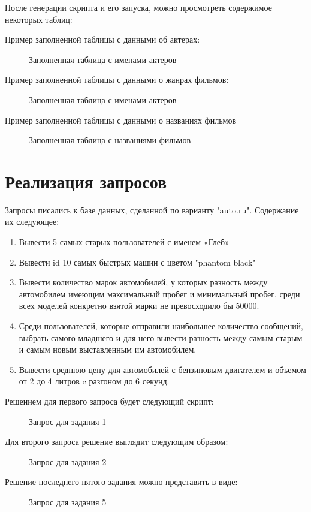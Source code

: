 После генерации скрипта и его запуска, можно просмотреть содержимое некоторых таблиц:

Пример заполненной таблицы с данными об актерах:
\begin{figure} [H]
    \center{\texttt{[image: ex1]}}
    \caption{Заполненная таблица с именами актеров}
\end{figure}

Пример заполненной таблицы с данными о жанрах фильмов:
\begin{figure} [H]
    \caption{Заполненная таблица с именами актеров}
\end{figure}

Пример заполненной таблицы с данными о названиях фильмов
\begin{figure}
    \caption{Заполненная таблица с названиями фильмов}
\end{figure}

\section{Реализация запросов}
Запросы писались к базе данных, сделанной по варианту "auto.ru". Содержание их следующее:
\begin{enumerate}
\item Вывести 5 самых старых пользователей с именем «Глеб»
\item Вывести id 10 самых быстрых машин с цветом "phantom black"
\item Вывести количество марок автомобилей, у которых разность между 
автомобилем имеющим максимальный пробег и минимальный пробег, среди всех 
моделей конкретно взятой марки не превосходило бы 50000.
\item Среди пользователей, которые отправили наибольшее количество сообщений, 
выбрать самого младшего и для него вывести разность между самым старым и самым 
новым выставленным им автомобилем.
\item Вывести среднюю цену для автомобилей с бензиновым двигателем и объемом от 2 до 4 литров c разгоном до 6 секунд.
\end{enumerate}

Решением для первого запроса будет следующий скрипт:
\begin{figure}[H]
    \caption{Запрос для задания 1}
\end{figure}

Для второго запроса решение выглядит следующим образом:
\begin{figure}[H]
    \caption{Запрос для задания 2}
\end{figure}

Решение последнего пятого задания можно представить в виде:
\begin{figure}[H]
    \caption{Запрос для задания 5}
\end{figure}


